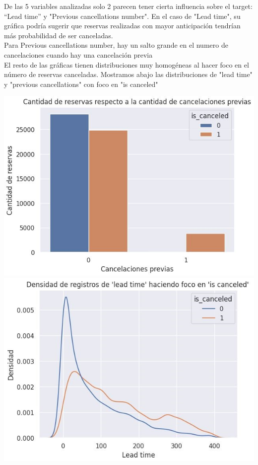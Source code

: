 \documentclass{article}
\begin{document}
De las 5 variables analizadas solo 2 parecen tener cierta influencia sobre el target: “Lead time” y "Previous cancellations number".
En el caso de "Lead time", su gráfica podría sugerir que reservas realizadas con mayor anticipación tendrían más probabilidad de ser canceladas.\\
Para Previous cancellations number, hay un salto grande en el numero de cancelaciones cuando hay una cancelación previa\\
El resto de las gráficas tienen distribuciones muy homogéneas al hacer foco en el número de reservas canceladas. 
Mostramos abajo las distribuciones de "lead time" y "previous cancellations" con foco en "is canceled"

\includegraphics[scale=0.2]{previous_cancellations_num}
    \hspace{4.5cm}
\includegraphics[scale=0.2]{lead_time}
\end{document}
